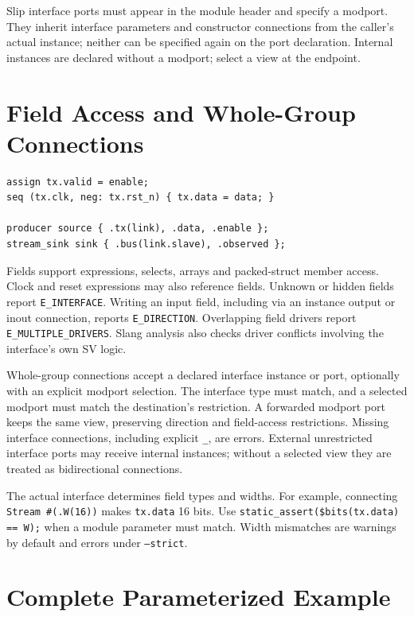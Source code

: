 \documentclass[lang=en,11pt]{elegantbook}
\newcommand{\code}[1]{\texttt{#1}}
\begin{document}
Slip interface ports must appear in the module header and specify a modport.
They inherit interface parameters and constructor connections from the caller's
actual instance; neither can be specified again on the port declaration.
Internal instances are declared without a modport; select a view at the endpoint.

\section{Field Access and Whole-Group Connections}

\begin{lstlisting}[language=Slip]
assign tx.valid = enable;
seq (tx.clk, neg: tx.rst_n) { tx.data = data; }

producer source { .tx(link), .data, .enable };
stream_sink sink { .bus(link.slave), .observed };
\end{lstlisting}

Fields support expressions,
selects, arrays and packed-struct member access. Clock and reset expressions may
also reference fields. Unknown or hidden fields report \code{E\_INTERFACE}.
Writing an input field, including via an instance output or inout connection,
reports \code{E\_DIRECTION}. Overlapping field drivers report
\code{E\_MULTIPLE\_DRIVERS}. Slang analysis also checks driver conflicts involving
the interface's own SV logic.

Whole-group connections accept a declared interface instance or port, optionally
with an explicit modport selection. The interface type must match, and a selected
modport must match the destination's restriction. A forwarded modport port keeps
the same view, preserving direction and field-access restrictions. Missing
interface connections, including explicit \code{\_}, are errors.
External unrestricted interface ports may receive internal instances; without
a selected view they are treated as bidirectional connections.

The actual interface determines field types and widths. For example, connecting
\code{Stream \#(.W(16))} makes \code{tx.data} 16 bits. Use
\code{static\_assert(\$bits(tx.data) == W);} when a module parameter must match.
Width mismatches are warnings by default and errors under \code{--strict}.

\section{Complete Parameterized Example}
\end{document}
